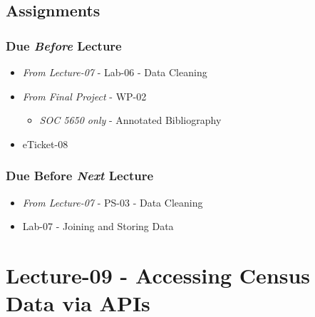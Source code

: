 \documentclass[]{book}
\providecommand{\tightlist}{%
  \setlength{\itemsep}{0pt}\setlength{\parskip}{0pt}}
\begin{document}
\hypertarget{assignments-9}{%
\subsection*{Assignments}\label{assignments-9}}

\hypertarget{due-before-lecture-7}{%
\subsubsection*{\texorpdfstring{Due \emph{Before} Lecture}{Due Before Lecture}}\label{due-before-lecture-7}}

\begin{itemize}
\tightlist
\item
  \emph{From Lecture-07} - Lab-06 - Data Cleaning
\item
  \emph{From Final Project} - WP-02

  \begin{itemize}
  \tightlist
  \item
    \emph{SOC 5650 only} - Annotated Bibliography
  \end{itemize}
\item
  eTicket-08
\end{itemize}

\hypertarget{due-before-next-lecture-6}{%
\subsubsection*{\texorpdfstring{Due Before \emph{Next} Lecture}{Due Before Next Lecture}}\label{due-before-next-lecture-6}}

\begin{itemize}
\tightlist
\item
  \emph{From Lecture-07} - PS-03 - Data Cleaning
\item
  Lab-07 - Joining and Storing Data
\end{itemize}

\hypertarget{lecture-09---accessing-census-data-via-apis}{%
\section*{Lecture-09 - Accessing Census Data via APIs}\label{lecture-09---accessing-census-data-via-apis}}
\end{document}
